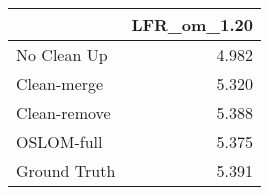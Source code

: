 \begin{tabular}{lr}
\toprule
{} & LFR_om_1.20 \\
\midrule
No Clean Up  &       4.982 \\
Clean-merge  &       5.320 \\
Clean-remove &       5.388 \\
OSLOM-full   &       5.375 \\
Ground Truth &       5.391 \\
\bottomrule
\end{tabular}
